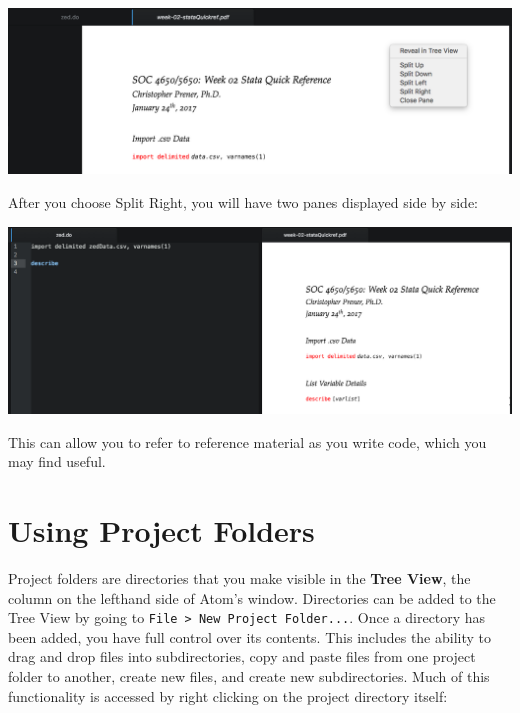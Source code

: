 \documentclass[]{book}
\theoremstyle{definition}
\theoremstyle{definition}
\theoremstyle{remark}
\begin{document}
\includegraphics[width=1\linewidth]{images/atomSplit}

After you choose Split Right, you will have two panes displayed side by
side:

\includegraphics[width=1\linewidth]{images/atomSplit2}

This can allow you to refer to reference material as you write code,
which you may find useful.

\section{Using Project Folders}\label{using-project-folders}

Project folders are directories that you make visible in the
\textbf{Tree View}, the column on the lefthand side of Atom's window.
Directories can be added to the Tree View by going to
\texttt{File\ \textgreater{}\ New\ Project\ Folder...}. Once a directory
has been added, you have full control over its contents. This includes
the ability to drag and drop files into subdirectories, copy and paste
files from one project folder to another, create new files, and create
new subdirectories. Much of this functionality is accessed by right
clicking on the project directory itself:
\end{document}
